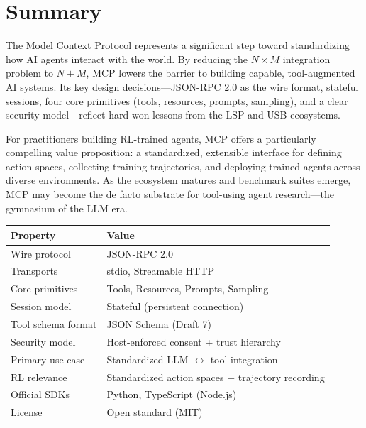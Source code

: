 \section{Summary}
\label{sec:mcp:summary}

The Model Context Protocol represents a significant step toward standardizing how AI agents interact with the world. By reducing the $N \times M$ integration problem to $N + M$, MCP lowers the barrier to building capable, tool-augmented AI systems. Its key design decisions---JSON-RPC 2.0 as the wire format, stateful sessions, four core primitives (tools, resources, prompts, sampling), and a clear security model---reflect hard-won lessons from the LSP and USB ecosystems.

For practitioners building RL-trained agents, MCP offers a particularly compelling value proposition: a standardized, extensible interface for defining action spaces, collecting training trajectories, and deploying trained agents across diverse environments. As the ecosystem matures and benchmark suites emerge, MCP may become the de facto substrate for tool-using agent research---the gymnasium of the LLM era.

\begin{keybox}
\begin{tabular}{@{}lp{11cm}@{}}
\toprule
\textbf{Property} & \textbf{Value} \\
\midrule
Wire protocol & JSON-RPC 2.0 \\
Transports & stdio, Streamable HTTP \\
Core primitives & Tools, Resources, Prompts, Sampling \\
Session model & Stateful (persistent connection) \\
Tool schema format & JSON Schema (Draft 7) \\
Security model & Host-enforced consent + trust hierarchy \\
Primary use case & Standardized LLM $\leftrightarrow$ tool integration \\
RL relevance & Standardized action spaces + trajectory recording \\
Official SDKs & Python, TypeScript (Node.js) \\
License & Open standard (MIT) \\
\bottomrule
\end{tabular}
\end{keybox}

